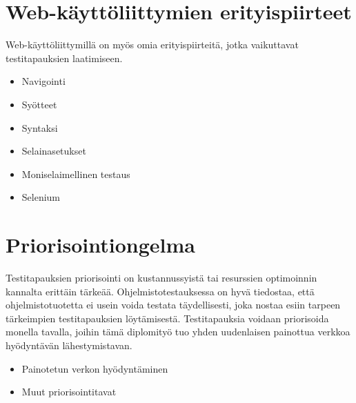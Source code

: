 \section{Web-käyttöliittymien erityispiirteet} \label{ch:08_webkayttoliittymien_erityispiirteet}

  Web-käyttöliittymillä on myös omia erityispiirteitä, jotka vaikuttavat testitapauksien laatimiseen.
  \begin{itemize}
    \item Navigointi
    \item Syötteet
    \item Syntaksi
    \item Selainasetukset
    \item Moniselaimellinen testaus
    \item Selenium
  \end{itemize}

\section{Priorisointiongelma} \label{ch:08_priorisointiongelma}

  Testitapauksien priorisointi on kustannussyistä tai resurssien optimoinnin kannalta erittäin tärkeää.
  Ohjelmistotestauksessa on hyvä tiedostaa, että ohjelmistotuotetta ei usein voida testata täydellisesti, joka nostaa esiin tarpeen tärkeimpien testitapauksien löytämisestä.
  Testitapauksia voidaan priorisoida monella tavalla, joihin tämä diplomityö tuo yhden uudenlaisen painottua verkkoa hyödyntävän lähestymistavan.
  \begin{itemize}
    \item Painotetun verkon hyödyntäminen
    \item Muut priorisointitavat
  \end{itemize}